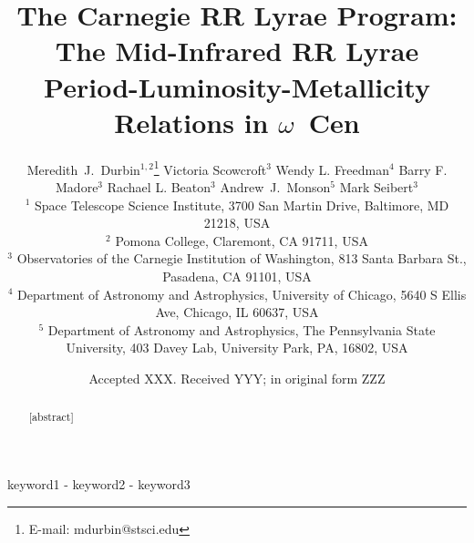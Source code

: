 \documentclass[a4paper,fleqn,usenatbib]{mnras}
\title[Mid-IR RRL PLZ Relations in $\omega$ Cen]{The Carnegie RR Lyrae Program: The Mid-Infrared RR Lyrae Period-Luminosity-Metallicity Relations in $\omega$~Cen}
\author[M.~J.~Durbin et al.]{Meredith~J.~Durbin$^{1,2}$\thanks{E-mail: mdurbin@stsci.edu}
Victoria Scowcroft$^{3}$
Wendy L. Freedman$^{4}$
Barry F. Madore$^{3}$
\newauthor Rachael L. Beaton$^{3}$
Andrew~J.~Monson$^{5}$
Mark Seibert$^{3}$
\\
$^1$ Space Telescope Science Institute, 3700 San Martin Drive, Baltimore, MD 21218, USA \\
$^2$ Pomona College, Claremont, CA 91711, USA \\
$^3$ Observatories of the Carnegie Institution of Washington, 813 Santa Barbara St., Pasadena, CA 91101, USA \\
$^4$ Department of Astronomy and Astrophysics, University of Chicago, 5640 S Ellis Ave, Chicago, IL 60637, USA \\
$^{5}$ Department of Astronomy and Astrophysics, The Pennsylvania State University, 403 Davey Lab, University Park, PA, 16802, USA \\
}
\date{Accepted XXX. Received YYY; in original form ZZZ}
\begin{document}
\label{firstpage}
\pagerange{\pageref{firstpage}-\pageref{lastpage}}
\maketitle

\begin{abstract}
[abstract]
\end{abstract}

\begin{keywords}
keyword1 - keyword2 - keyword3
\end{keywords}







\end{document}
